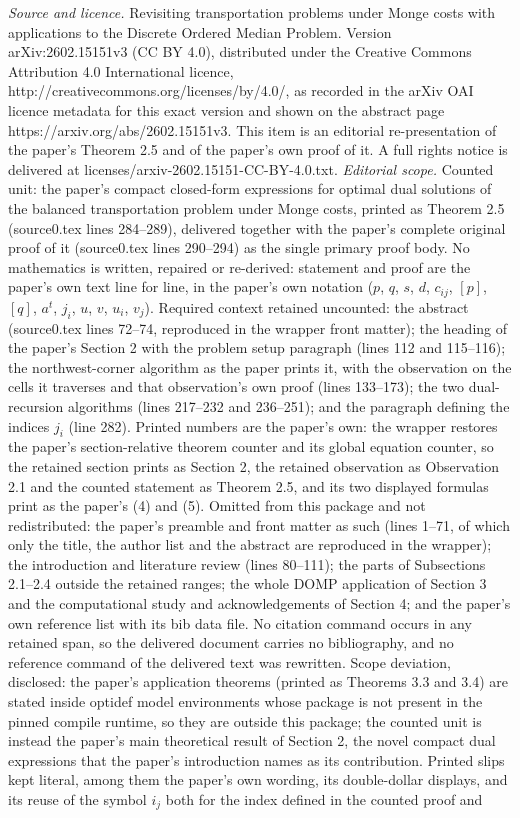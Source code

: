 \documentclass[10pt,a4paper]{amsart}
\begin{document}
\vspace{1em}
\noindent\textit{Source and licence.} Revisiting transportation problems under Monge costs with applications to the Discrete Ordered Median Problem. Version arXiv:2602.15151v3 (CC BY 4.0), distributed under the Creative Commons Attribution 4.0 International licence, http://creativecommons.org/licenses/by/4.0/, as recorded in the arXiv OAI licence metadata for this exact version and shown on the abstract page https://arxiv.org/abs/2602.15151v3. This item is an editorial re-presentation of the paper's Theorem 2.5 and of the paper's own proof of it. A full rights notice is delivered at licenses/arxiv-2602.15151-CC-BY-4.0.txt.
\noindent\textit{Editorial scope.} Counted unit: the paper's compact closed-form expressions for optimal dual solutions of the balanced transportation problem under Monge costs, printed as Theorem 2.5 (source0.tex lines 284--289), delivered together with the paper's complete original proof of it (source0.tex lines 290--294) as the single primary proof body. No mathematics is written, repaired or re-derived: statement and proof are the paper's own text line for line, in the paper's own notation ($p$, $q$, $s$, $d$, $c_{ij}$, $[p]$, $[q]$, $a^t$, $j_i$, $u$, $v$, $u_i$, $v_j$). Required context retained uncounted: the abstract (source0.tex lines 72--74, reproduced in the wrapper front matter); the heading of the paper's Section 2 with the problem setup paragraph (lines 112 and 115--116); the northwest-corner algorithm as the paper prints it, with the observation on the cells it traverses and that observation's own proof (lines 133--173); the two dual-recursion algorithms (lines 217--232 and 236--251); and the paragraph defining the indices $j_i$ (line 282). Printed numbers are the paper's own: the wrapper restores the paper's section-relative theorem counter and its global equation counter, so the retained section prints as Section 2, the retained observation as Observation 2.1 and the counted statement as Theorem 2.5, and its two displayed formulas print as the paper's (4) and (5). Omitted from this package and not redistributed: the paper's preamble and front matter as such (lines 1--71, of which only the title, the author list and the abstract are reproduced in the wrapper); the introduction and literature review (lines 80--111); the parts of Subsections 2.1--2.4 outside the retained ranges; the whole DOMP application of Section 3 and the computational study and acknowledgements of Section 4; and the paper's own reference list with its bib data file. No citation command occurs in any retained span, so the delivered document carries no bibliography, and no reference command of the delivered text was rewritten. Scope deviation, disclosed: the paper's application theorems (printed as Theorems 3.3 and 3.4) are stated inside optidef model environments whose package is not present in the pinned compile runtime, so they are outside this package; the counted unit is instead the paper's main theoretical result of Section 2, the novel compact dual expressions that the paper's introduction names as its contribution. Printed slips kept literal, among them the paper's own wording, its double-dollar displays, and its reuse of the symbol $i_j$ both for the index defined in the counted proof and 
\end{document}
